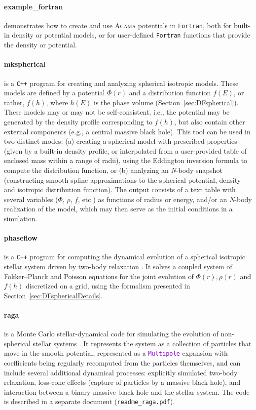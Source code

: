 \documentclass[12pt]{article}
\newcommand{\Agama}{\textsc{Agama}\xspace}
\newcommand{\Nbody}{\textsl{N}-body\xspace}
\newcommand{\Cpp}  {\texttt{C++}\xspace}
\newcommand{\Fortran}{\texttt{Fortran}\xspace}
\newcommand{\ttt}[1]{\textcolor{darkviolet}{\texttt{#1}}}
\begin{document}
\paragraph{example_fortran} demonstrates how to create and use \Agama potentials in \Fortran, both for built-in density or potential models, or for user-defined \Fortran functions that provide the density or potential.

\paragraph{mkspherical} is a \Cpp program for creating and analyzing spherical isotropic models. These models are defined by a potential $\Phi(r)$ and a distribution function $f(E)$, or rather, $f(h)$, where $h(E)$ is the phase volume (Section~\ref{sec:DFspherical}). These models may or may not be self-consistent, i.e., the potential may be generated by the density profile corresponding to $f(h)$, but also contain other external components (e.g., a central massive black hole). This tool can be used in two distinct modes: (a) creating a spherical model with prescribed properties (given by a built-in density profile, or interpolated from a user-provided table of enclosed mass within a range of radii), using the Eddington inversion formula to compute the distribution function, or (b) analyzing an \Nbody snapshot (constructing smooth spline approximations to the spherical potential, density and isotropic distribution function). The output consists of a text table with several variables ($\Phi$, $\rho$, $f$, etc.) as functions of radius or energy, and/or an \Nbody realization of the model, which may then serve as the initial conditions in a simulation.

\paragraph{phaseflow} is a \Cpp program for computing the dynamical evolution of a spherical isotropic stellar system driven by two-body relaxation \cite{Vasiliev2017}. It solves a coupled system of Fokker--Planck and Poisson equations for the joint evolution of $\Phi(r), \rho(r)$ and $f(h)$ discretized on a grid, using the formalism presented in Section~\ref{sec:DFsphericalDetails}.

\paragraph{raga} is a Monte Carlo stellar-dynamical code for simulating the evolution of non-spherical stellar systems \cite{Vasiliev2015}. It represents the system as a collection of particles that move in the smooth potential, represented as a \ttt{Multipole} expansion with coefficients being regularly recomputed from the particles themselves, and can include several additional dynamical processes: explicitly simulated two-body relaxation, loss-cone effects (capture of particles by a massive black hole), and interaction between a binary massive black hole and the stellar system. The code is described in a separate document (\texttt{readme_raga.pdf}).
\end{document}
